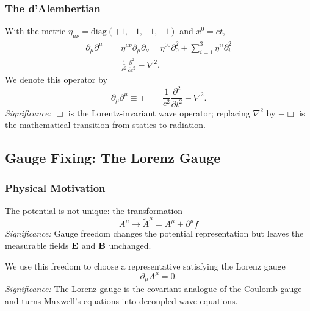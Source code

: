 \subsubsection*{The d'Alembertian}
With the metric $\eta_{\mu\nu}=\mathrm{diag}(+1,-1,-1,-1)$ and $x^0=ct$,
\begin{align*}
  \partial_\mu\partial^\mu
  &=\eta^{\mu\nu}\partial_\mu\partial_\nu
    =\eta^{00}\partial_0^2+\sum_{i=1}^{3}\eta^{ii}\partial_i^2 \\
  &=\frac{1}{c^2}\frac{\partial^2}{\partial t^2}-\nabla^2.
\end{align*}
We denote this operator by
\begin{equation}\label{eq:lec20-dalembertian}
  \boxed{\partial_\mu\partial^\mu\equiv \Box
  =\frac{1}{c^2}\frac{\partial^2}{\partial t^2}-\nabla^2.}
\end{equation}
\textit{Significance:} $\Box$ is the Lorentz-invariant wave operator; replacing $\nabla^2$ by $-\Box$ is the mathematical transition from statics to radiation.

\subsection{Gauge Fixing: The Lorenz Gauge}\label{subsec:lec20-lorenz-gauge}

\subsubsection*{Physical Motivation}
The potential is not unique: the transformation
\begin{equation}\label{eq:lec20-gauge-transformation}
  \boxed{A^\mu\longrightarrow \widetilde A^\mu=A^\mu+\partial^\mu f}
\end{equation}
\textit{Significance:} Gauge freedom changes the potential representation but leaves the measurable fields $\mathbf{E}$ and $\mathbf{B}$ unchanged.

We use this freedom to choose a representative satisfying the Lorenz gauge
\begin{equation}\label{eq:lec20-lorenz-condition}
  \boxed{\partial_\mu A^\mu=0.}
\end{equation}
\textit{Significance:} The Lorenz gauge is the covariant analogue of the Coulomb gauge and turns Maxwell's equations into decoupled wave equations.

